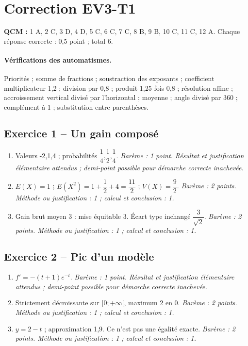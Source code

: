 \clearpage\section*{Correction EV3-T1}\label{EV3-T1-CORR}
\textbf{QCM :} 1 A, 2 C, 3 D, 4 D, 5 C, 6 C, 7 C, 8 B, 9 B, 10 C, 11 C, 12 A. Chaque réponse correcte : 0,5 point ; total 6.
\paragraph{Vérifications des automatismes.} Priorités ; somme de fractions ; soustraction des exposants ; coefficient multiplicateur 1,2 ; division par 0,8 ; produit 1,25 fois 0,8 ; résolution affine ; accroissement vertical divisé par l’horizontal ; moyenne ; angle divisé par 360 ; complément à 1 ; substitution entre parenthèses.
\subsection*{Exercice 1 -- Un gain composé}
\begin{enumerate}
\item Valeurs -2,1,4 ; probabilités $\dfrac{1}{4}$,$\dfrac{1}{2}$,$\dfrac{1}{4}$. \textit{Barème : 1 point. Résultat et justification élémentaire attendus ; demi-point possible pour démarche correcte inachevée.}
\item $E(X)=1$ ; $E(X^2)=1+\dfrac{1}{2}+4=\dfrac{11}{2}$ ; $V(X)=\dfrac{9}{2}$. \textit{Barème : 2 points. Méthode ou justification : 1 ; calcul et conclusion : 1.}
\item Gain brut moyen 3 : mise équitable 3. Écart type inchangé $\dfrac{3}{\sqrt 2}$. \textit{Barème : 2 points. Méthode ou justification : 1 ; calcul et conclusion : 1.}
\end{enumerate}
\subsection*{Exercice 2 -- Pic d’un modèle}
\begin{enumerate}
\item $f\prime=-(t+1)e^{-t}$. \textit{Barème : 1 point. Résultat et justification élémentaire attendus ; demi-point possible pour démarche correcte inachevée.}
\item Strictement décroissante sur $[0;+\infty[$, maximum 2 en 0. \textit{Barème : 2 points. Méthode ou justification : 1 ; calcul et conclusion : 1.}
\item $y=2-t$ ; approximation 1,9. Ce n’est pas une égalité exacte. \textit{Barème : 2 points. Méthode ou justification : 1 ; calcul et conclusion : 1.}
\end{enumerate}
